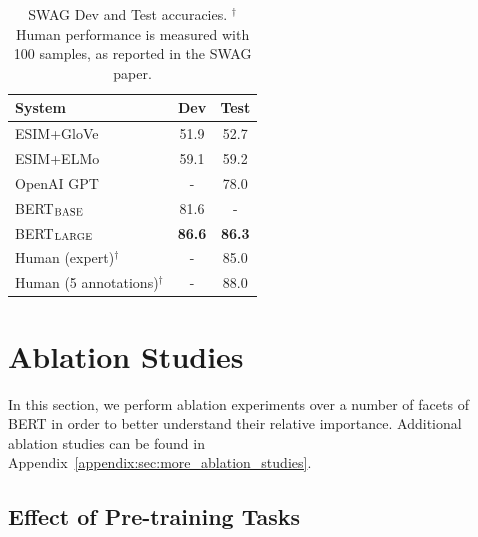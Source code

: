 \documentclass[11pt,a4paper]{article}
\newcommand\bertbase{BERT$_{\small \textsc{BASE}}$\xspace}
\newcommand\bertlarge{BERT$_{\small \textsc{LARGE}}$\xspace}
\begin{document}
\begin{table}[tb]
\begin{center}
{
\small
 \begin{tabular}{lcc}
    \toprule
System             &  Dev    & Test\\ 
\midrule
ESIM+GloVe   & 51.9       & 52.7 \\
ESIM+ELMo    & 59.1       & 59.2 \\
OpenAI GPT    & -       & 78.0 \\
\midrule
\bertbase    & 81.6       &  - \\
\bertlarge   & {\bf 86.6} & {\bf 86.3} \\
\midrule
Human (expert)$^\dagger$ & - & 85.0 \\
Human (5 annotations)$^\dagger$        & -          & 88.0 \\
\bottomrule
\end{tabular}
}
\caption{SWAG Dev and Test accuracies. 
$^\dagger$Human performance is measured with 100 samples, as reported in the SWAG paper.}
\label{tab:swag_official}
\end{center}
\end{table}

\section{Ablation Studies}
\label{sec:ablation}
In this section, we perform ablation experiments over a number of facets of BERT in order to better understand their relative importance. Additional ablation studies can be found in Appendix~\ref{appendix:sec:more_ablation_studies}.

\subsection{Effect of Pre-training Tasks}
\end{document}
